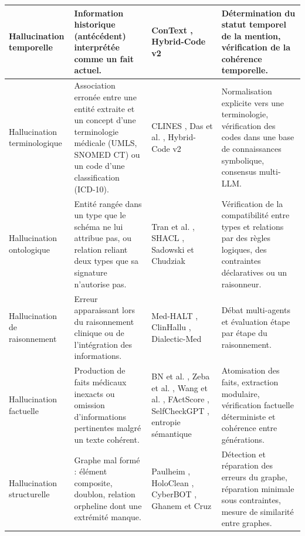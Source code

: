 {\begin{longtable}{|>{\raggedright\arraybackslash}p{2.6cm}|>{\raggedright\arraybackslash}p{4.2cm}|>{\raggedright\arraybackslash}p{3.4cm}|>{\raggedright\arraybackslash}p{4.0cm}|}
Hallucination temporelle &
Information historique (antécédent) interprétée comme un fait actuel. &
ConText \cite{harkema2009context}, Hybrid-Code v2 \cite{hybrid2512v2} &
Détermination du statut temporel de la mention, vérification de la cohérence temporelle.\\
\hline

Hallucination terminologique &
Association erronée entre une entité extraite et un concept d'une terminologie médicale (UMLS, SNOMED CT) ou un code d'une classification (ICD-10). &
CLINES \cite{yang2025clines}, Das et al. \cite{das2026clinical}, Hybrid-Code v2 \cite{hybrid2512v2} &
Normalisation explicite vers une terminologie, vérification des codes dans une base de connaissances symbolique, consensus multi-LLM.\\
\hline

Hallucination ontologique &
Entité rangée dans un type que le schéma ne lui attribue pas, ou relation reliant deux types que sa signature n'autorise pas. &
Tran et al. \cite{tran2025aspworkflow}, SHACL \cite{shacl2017}, Sadowski et Chudziak \cite{sadowski2026structured} &
Vérification de la compatibilité entre types et relations par des règles logiques, des contraintes déclaratives ou un raisonneur.\\
\hline

Hallucination de raisonnement &
Erreur apparaissant lors du raisonnement clinique ou de l'intégration des informations. &
Med-HALT \cite{pal2023medhalt}, ClinHallu \cite{yang2026clinhallu}, Dialectic-Med \cite{lu2026dialectic} &
Débat multi-agents et évaluation étape par étape du raisonnement.\\
\hline

Hallucination factuelle &
Production de faits médicaux inexacts ou omission d'informations pertinentes malgré un texte cohérent. &
BN et al. \cite{bn2025fact}, Zeba et al. \cite{zeba2026mitigating}, Wang et al. \cite{wang2024feature}, FActScore \cite{min2023factscore}, SelfCheckGPT \cite{manakul2023selfcheckgpt}, entropie sémantique \cite{farquhar2024semantic} &
Atomisation des faits, extraction modulaire, vérification factuelle déterministe et cohérence entre générations.\\
\hline

Hallucination structurelle &
Graphe mal formé : élément composite, doublon, relation orpheline dont une extrémité manque. &
Paulheim \cite{paulheim2017refinement}, HoloClean \cite{rekatsinas2017holoclean}, CyberBOT \cite{zhao2025cyberbot}, Ghanem et Cruz \cite{ghanem2024enhancing} &
Détection et réparation des erreurs du graphe, réparation minimale sous contraintes, mesure de similarité entre graphes.\\
\end{longtable}
}

